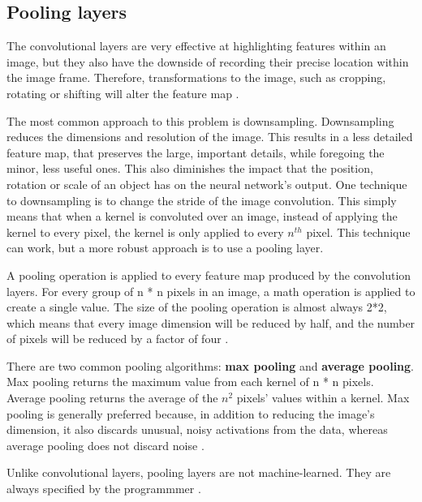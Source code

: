 \documentclass[12pt,a4paper,notitlepage]{article}
\begin{document}
\subsection{Pooling layers}
The convolutional layers are very effective at highlighting features within an image, but they also have the downside of recording their precise location within the image frame. Therefore, transformations to the image, such as cropping, rotating or shifting will alter the feature map \cite{brownlee_gentle_2019}.

The most common approach to this problem is downsampling. Downsampling reduces the dimensions and resolution of the image. This results in a less detailed feature map, that preserves the large, important details, while foregoing the minor, less useful ones. This also diminishes the impact that the position, rotation or scale of an object has on the neural network's output. One technique to downsampling is to change the stride of the image convolution. This simply means that when a kernel is convoluted over an image, instead of applying the kernel to every pixel, the kernel is only applied to every \(n^{th}\) pixel. This technique can work, but a more robust approach is to use a pooling layer.

A pooling operation is applied to every feature map produced by the convolution layers. For every group of n * n pixels in an image, a math operation is applied to create a single value. The size of the pooling operation is almost always 2*2, which means that every image dimension will be reduced by half, and the number of pixels will be reduced by a factor of four \cite{brownlee_gentle_2019}.

There are two common pooling algorithms: \textbf{max pooling} and \textbf{average pooling}. Max pooling returns the maximum value from each kernel of n * n pixels. Average pooling returns the average of the \(n^2\) pixels' values within a kernel. Max pooling is generally preferred because, in addition to reducing the image's dimension, it also discards unusual, noisy activations from the data, whereas average pooling does not discard noise \cite{saha_comprehensive_2018}.

Unlike convolutional layers, pooling layers are not machine-learned. They are always specified by the programmmer \cite{brownlee_gentle_2019}.
\end{document}
